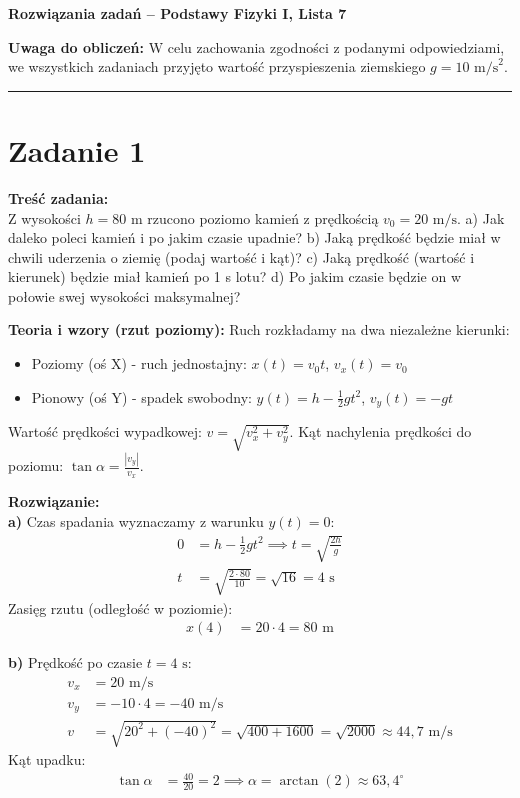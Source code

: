 \documentclass[11pt, a4paper]{article}
\begin{document}
\begin{center}
    \LARGE \textbf{Rozwiązania zadań -- Podstawy Fizyki I, Lista 7}
\end{center}
\vspace{0.5cm}

\textbf{Uwaga do obliczeń:} W celu zachowania zgodności z podanymi odpowiedziami, we wszystkich zadaniach przyjęto wartość przyspieszenia ziemskiego $g = 10 \text{ m/s}^2$.

\vspace{0.5cm}
\hrule
\vspace{0.5cm}

\section*{Zadanie 1}

\textbf{Treść zadania:} \\
Z wysokości $h=80$ m rzucono poziomo kamień z prędkością $v_{0}=20 \text{ m/s}$. 
a) Jak daleko poleci kamień i po jakim czasie upadnie? 
b) Jaką prędkość będzie miał w chwili uderzenia o ziemię (podaj wartość i kąt)? 
c) Jaką prędkość (wartość i kierunek) będzie miał kamień po 1 s lotu? 
d) Po jakim czasie będzie on w połowie swej wysokości maksymalnej?

\textbf{Teoria i wzory (rzut poziomy):}
Ruch rozkładamy na dwa niezależne kierunki:
\begin{itemize}
    \item Poziomy (oś X) - ruch jednostajny: $x(t) = v_{0}t$, \quad $v_x(t) = v_0$
    \item Pionowy (oś Y) - spadek swobodny: $y(t) = h - \frac{1}{2}gt^2$, \quad $v_y(t) = -gt$
\end{itemize}
Wartość prędkości wypadkowej: $v = \sqrt{v_x^2 + v_y^2}$. 
Kąt nachylenia prędkości do poziomu: $\tan\alpha = \frac{|v_y|}{v_x}$.

\textbf{Rozwiązanie:} \\
\textbf{a)} Czas spadania wyznaczamy z warunku $y(t) = 0$:
\begin{align*}
    0 &= h - \frac{1}{2}gt^2 \implies t = \sqrt{\frac{2h}{g}} \\
    t &= \sqrt{\frac{2 \cdot 80}{10}} = \sqrt{16} = 4 \text{ s}
\end{align*}
Zasięg rzutu (odległość w poziomie):
\begin{align*}
    x(4) &= 20 \cdot 4 = 80 \text{ m}
\end{align*}

\textbf{b)} Prędkość po czasie $t = 4 \text{ s}$:
\begin{align*}
    v_x &= 20 \text{ m/s} \\
    v_y &= -10 \cdot 4 = -40 \text{ m/s} \\
    v &= \sqrt{20^2 + (-40)^2} = \sqrt{400 + 1600} = \sqrt{2000} \approx 44,7 \text{ m/s}
\end{align*}
Kąt upadku:
\begin{align*}
    \tan\alpha &= \frac{40}{20} = 2 \implies \alpha = \arctan(2) \approx 63,4^\circ
\end{align*}
\end{document}
